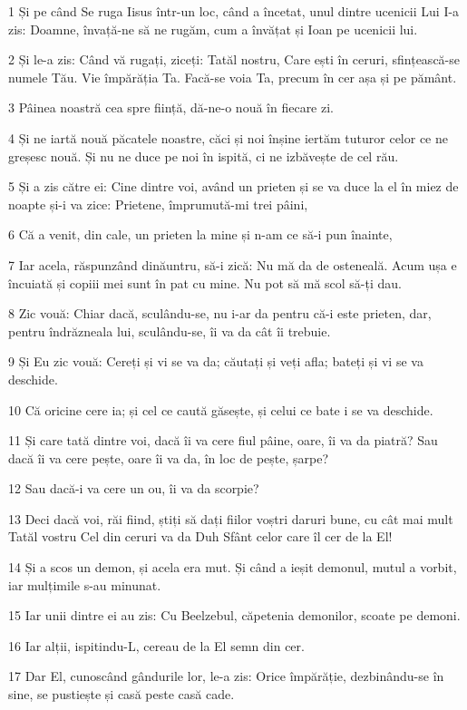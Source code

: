 \par 1 Și pe când Se ruga Iisus într-un loc, când a încetat, unul dintre ucenicii Lui I-a zis: Doamne, învață-ne să ne rugăm, cum a învățat și Ioan pe ucenicii lui.
\par 2 Și le-a zis: Când vă rugați, ziceți: Tatăl nostru, Care ești în ceruri, sfințească-se numele Tău. Vie împărăția Ta. Facă-se voia Ta, precum în cer așa și pe pământ.
\par 3 Pâinea noastră cea spre ființă, dă-ne-o nouă în fiecare zi.
\par 4 Și ne iartă nouă păcatele noastre, căci și noi înșine iertăm tuturor celor ce ne greșesc nouă. Și nu ne duce pe noi în ispită, ci ne izbăvește de cel rău.
\par 5 Și a zis către ei: Cine dintre voi, având un prieten și se va duce la el în miez de noapte și-i va zice: Prietene, împrumută-mi trei pâini,
\par 6 Că a venit, din cale, un prieten la mine și n-am ce să-i pun înainte,
\par 7 Iar acela, răspunzând dinăuntru, să-i zică: Nu mă da de osteneală. Acum ușa e încuiată și copiii mei sunt în pat cu mine. Nu pot să mă scol să-ți dau.
\par 8 Zic vouă: Chiar dacă, sculându-se, nu i-ar da pentru că-i este prieten, dar, pentru îndrăzneala lui, sculându-se, îi va da cât îi trebuie.
\par 9 Și Eu zic vouă: Cereți și vi se va da; căutați și veți afla; bateți și vi se va deschide.
\par 10 Că oricine cere ia; și cel ce caută găsește, și celui ce bate i se va deschide.
\par 11 Și care tată dintre voi, dacă îi va cere fiul pâine, oare, îi va da piatră? Sau dacă îi va cere pește, oare îi va da, în loc de pește, șarpe?
\par 12 Sau dacă-i va cere un ou, îi va da scorpie?
\par 13 Deci dacă voi, răi fiind, știți să dați fiilor voștri daruri bune, cu cât mai mult Tatăl vostru Cel din ceruri va da Duh Sfânt celor care îl cer de la El!
\par 14 Și a scos un demon, și acela era mut. Și când a ieșit demonul, mutul a vorbit, iar mulțimile s-au minunat.
\par 15 Iar unii dintre ei au zis: Cu Beelzebul, căpetenia demonilor, scoate pe demoni.
\par 16 Iar alții, ispitindu-L, cereau de la El semn din cer.
\par 17 Dar El, cunoscând gândurile lor, le-a zis: Orice împărăție, dezbinându-se în sine, se pustiește și casă peste casă cade.
